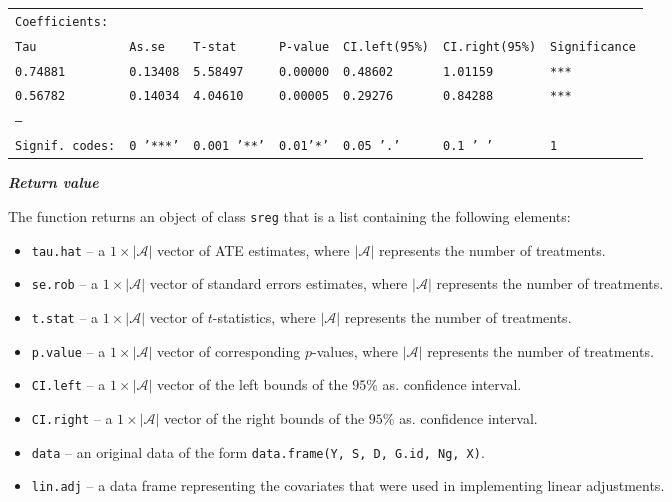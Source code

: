 \documentclass{article}
\begin{document}
\begin{flushleft}
\begin{tabular}{lllllll}
\texttt{Coefficients:} \\
\texttt{Tau} & \texttt{As.se} & \texttt{T-stat} & \texttt{P-value} & \texttt{CI.left(95\%)} & \texttt{CI.right(95\%)} & \texttt{Significance} \\
\texttt{0.74881} & \texttt{0.13408} & \texttt{5.58497} & \texttt{0.00000} & \texttt{0.48602} & \texttt{1.01159} & \texttt{***} \\
\texttt{0.56782} & \texttt{0.14034} & \texttt{4.04610} & \texttt{0.00005} & \texttt{0.29276} & \texttt{0.84288} & \texttt{***} \\
\texttt{---} \\
\texttt{Signif. codes:} & \texttt{0 '***'} & \texttt{0.001 '**'} & \texttt{0.01'*'} & \texttt{0.05 '.'} & \texttt{0.1 ' '} & \texttt{1} \\
\end{tabular}
\end{flushleft}

\noindent\textit{\textbf{Return value}}

The function returns an object of class \texttt{sreg} that is a list containing the following elements:
\begin{itemize}
\item \texttt{tau.hat} -- a $1 \times |\mathcal A|$ vector of ATE estimates, where $|\mathcal A|$ represents the number of treatments.
\item \texttt{se.rob} -- a $1 \times |\mathcal A|$ vector of standard errors estimates, where $|\mathcal A|$ represents the number of treatments.
\item \texttt{t.stat} -- a $1 \times |\mathcal A|$ vector of $t$-statistics, where $|\mathcal A|$ represents the number of treatments.
\item \texttt{p.value} -- a $1 \times |\mathcal A|$ vector of corresponding $p$-values, where $|\mathcal A|$ represents the number of treatments.
\item \texttt{CI.left} -- a $1 \times |\mathcal A|$ vector of the left bounds of the $95\%$ as. confidence interval.
\item \texttt{CI.right} -- a $1 \times |\mathcal A|$ vector of the right bounds of the $95\%$ as. confidence interval.
\item \texttt{data} -- an original data of the form \texttt{data.frame(Y, S, D, G.id, Ng, X)}.
\item \texttt{lin.adj} -- a data frame representing the covariates that were used in implementing linear adjustments.
\end{itemize}
\end{document}
